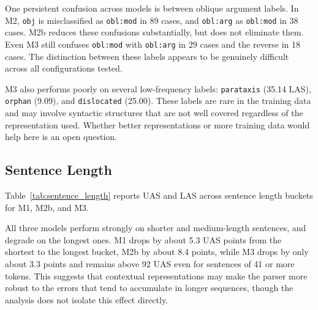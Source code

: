 \documentclass[12pt,letterpaper]{article}
\begin{document}
One persistent confusion across models is between oblique argument labels. In M2, \texttt{obj} is misclassified as \texttt{obl:mod} in 89 cases, and \texttt{obl:arg} as \texttt{obl:mod} in 38 cases. M2b reduces these confusions substantially, but does not eliminate them. Even M3 still confuses \texttt{obl:mod} with \texttt{obl:arg} in 29 cases and the reverse in 18 cases. The distinction between these labels appears to be genuinely difficult across all configurations tested.

M3 also performs poorly on several low-frequency labels: \texttt{parataxis} (35.14 LAS), \texttt{orphan} (9.09), and \texttt{dislocated} (25.00). These labels are rare in the training data and may involve syntactic structures that are not well covered regardless of the representation used. Whether better representations or more training data would help here is an open question.
\subsection{Sentence Length}
\label{subsec:length_distance}

Table~\ref{tab:sentence_length} reports UAS and LAS across sentence length buckets for M1, M2b, and M3.
\FloatBarrier
\begin{table}[ht]
\centering
\caption{UAS / LAS (\%) by sentence length bucket for M1, M2b, and M3.}
\label{tab:sentence_length}
\end{table}
\FloatBarrier
All three models perform strongly on shorter and medium-length sentences, and degrade on the longest ones. M1 drops by about 5.3 UAS points from the shortest to the longest bucket, M2b by about 8.4 points, while M3 drops by only about 3.3 points and remains above 92 UAS even for sentences of 41 or more tokens. This suggests that contextual representations may make the parser more robust to the errors that tend to accumulate in longer sequences, though the analysis does not isolate this effect directly.
\end{document}
